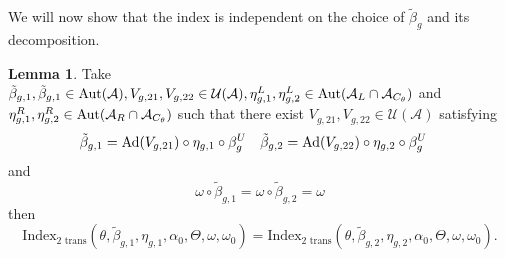 \documentclass[12pt,a4paper,twoside]{article}
\let\originalleft\left
\let\originalright\right
\renewcommand{\left}{\mathopen{}\mathclose\bgroup\originalleft}
\renewcommand{\right}{\aftergroup\egroup\originalright}
\newcommand{\UU}{\mathcal U}
\renewcommand{\AA}{\mathcal A}
\newcommand{\Ad}[1]{\textrm{Ad}\left(#1\right)}
\newcommand{\Aut}[1]{\textrm{Aut}\left(#1\right)}
\theoremstyle{definition}
\newtheorem{lemma}[theorem]{Lemma}
\numberwithin{equation}{section}
\begin{document}
We will now show that the index is independent on the choice of $\tilde{\beta}_g$ and its decomposition.
\begin{lemma}\label{lem:InvarianceUnderChoiceBetaTwoTranslations}
	Take $\tilde{\beta}_{g,1},\tilde{\beta}_{g,1}\in\Aut{\AA},V_{g,21},V_{g,22}\in\UU(\AA),\eta_{g,1}^L,\eta_{g,2}^L\in \Aut{\AA_L\cap\AA_{C_\theta}}$ and $\eta_{g,1}^R,\eta_{g,2}^R\in \Aut{\AA_R\cap\AA_{C_\theta}}$ such that there exist $V_{g,21},V_{g,22}\in\UU(\AA)$ satisfying
	\begin{align}\label{eq:InvarianceUnderChoiceBetaTwoBetasTwoTranslations}
		\tilde{\beta}_{g,1}&=\Ad{V_{g,21}}\circ\eta_{g,1}\circ\beta^U_g&\tilde{\beta}_{g,2}&=\Ad{V_{g,22}}\circ\eta_{g,2}\circ\beta^U_g
	\end{align}
	and
	\begin{equation}
		\omega\circ\tilde{\beta}_{g,1}=\omega\circ\tilde{\beta}_{g,2}=\omega
	\end{equation}
	then
	\begin{equation}
		\textrm{Index}_{\text{2 trans}}(\theta,\tilde{\beta}_{g,1},\eta_{g,1},\alpha_{0},\Theta,\omega,\omega_0)=\textrm{Index}_{\text{2 trans}}(\theta,\tilde{\beta}_{g,2},\eta_{g,2},\alpha_{0},\Theta,\omega,\omega_0).
	\end{equation}
\end{lemma}
\end{document}
